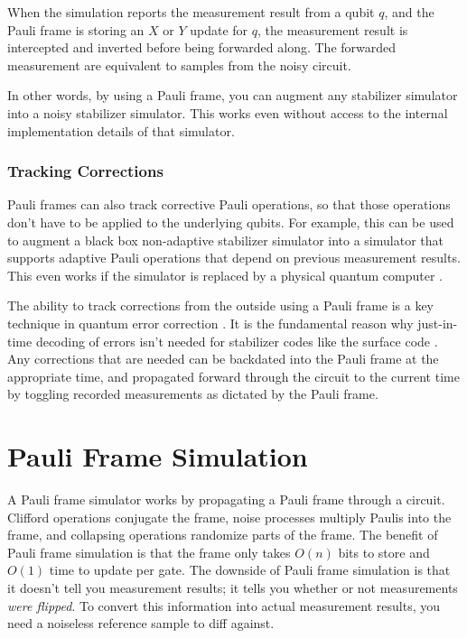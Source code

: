 \documentclass[onecolumn,unpublished]{quantumarticle}
\theoremstyle{definition}
\theoremstyle{definition}
\theoremstyle{definition}
\begin{document}
When the simulation reports the measurement result from a qubit $q$, and the Pauli frame is storing an $X$ or $Y$ update for $q$, the measurement result is intercepted and inverted before being forwarded along.
The forwarded measurement are equivalent to samples from the noisy circuit.

In other words, by using a Pauli frame, you can augment any stabilizer simulator into a noisy stabilizer simulator.
This works even without access to the internal implementation details of that simulator.

\subsubsection{Tracking Corrections}

Pauli frames can also track corrective Pauli operations, so that those operations don't have to be applied to the underlying qubits.
For example, this can be used to augment a black box non-adaptive stabilizer simulator into a simulator that supports adaptive Pauli operations that depend on previous measurement results.
This even works if the simulator is replaced by a physical quantum computer \cite{ware2017experimental}.

The ability to track corrections from the outside using a Pauli frame is a key technique in quantum error correction \cite{knill2005quantum}.
It is the fundamental reason why just-in-time decoding of errors isn't needed for stabilizer codes like the surface code \cite{fowler2012surfacecodereview}.
Any corrections that are needed can be backdated into the Pauli frame at the appropriate time, and propagated forward through the circuit to the current time by toggling recorded measurements as dictated by the Pauli frame.

\section{Pauli Frame Simulation}
\label{sec:framesim}

A Pauli frame simulator works by propagating a Pauli frame through a circuit.
Clifford operations conjugate the frame, noise processes multiply Paulis into the frame, and collapsing operations randomize parts of the frame.
The benefit of Pauli frame simulation is that the frame only takes $O(n)$ bits to store and $O(1)$ time to update per gate.
The downside of Pauli frame simulation is that it doesn't tell you measurement results; it tells you whether or not measurements {\em were flipped}.
To convert this information into actual measurement results, you need a noiseless reference sample to diff against.
\end{document}
